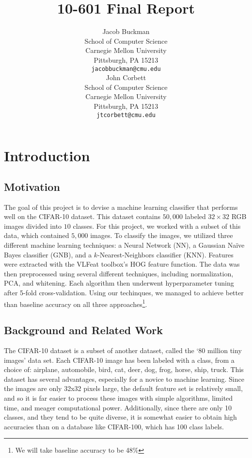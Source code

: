 \documentclass{article} %
\title{10-601 Final Report}
\author{
Jacob Buckman \\
School of Computer Science\\
Carnegie Mellon University\\
Pittsburgh, PA 15213 \\
\texttt{jacobbuckman@cmu.edu} \\
\And
John Corbett \\
School of Computer Science \\
Carnegie Mellon University \\
Pittsburgh, PA 15213 \\
\texttt{jtcorbett@cmu.edu} \\
}
\begin{document}
\maketitle

\section{Introduction}

\subsection*{Motivation}

The goal of this project is to devise a machine learning classifier that performs well on the CIFAR-10 dataset. This dataset contains $50,000$ labeled $32 \times 32$ RGB images divided into $10$ classes. For this project, we worked with a subset of this data, which contained $5,000$ images. To classify the images, we utilized three different machine learning techniques: a Neural Network (NN), a Gaussian Na\"ive Bayes classifier (GNB), and a $k$-Nearest-Neighbors classifier (KNN). Features were extracted with the VLFeat toolbox's HOG feature function. The data was then preprocessed using several different techniques, including normalization, PCA, and whitening. Each algorithm then underwent hyperparameter tuning after 5-fold cross-validation. Using our techinques, we managed to achieve better than baseline accuracy on all three approaches\footnote{We will take baseline accuracy to be 48\%}.

\subsection*{Background and Related Work}

The CIFAR-10 dataset is a subset of another dataset, called the `80 million tiny images' data set. Each CIFAR-10 image has been labeled with a class, from a choice of: airplane, automobile, bird, cat, deer, dog, frog, horse, ship, truck. This dataset has several advantages, especially for a novice to machine learning. Since the images are only 32x32 pixels large, the default feature set is relatively small, and so it is far easier to process these images with simple algorithms, limited time, and meager computational power. Additionally, since there are only 10 classes, and they tend to be quite diverse, it is somewhat easier to obtain high accuracies than on a database like CIFAR-100, which has 100 class labels.
\end{document}
